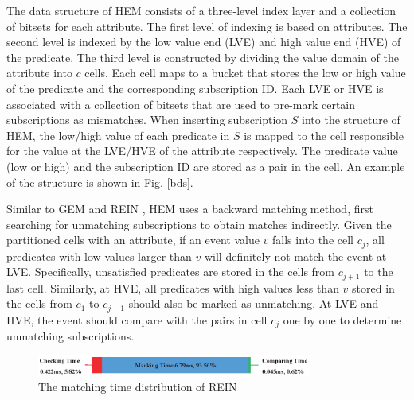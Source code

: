 \documentclass[runningheads]{llncs}
\begin{document}
The data structure of HEM consists of a three-level index layer and a collection of bitsets for each attribute.
The first level of indexing is based on attributes. The second level is indexed by the low value end (LVE) and high value end (HVE) of the predicate. The third level is constructed by dividing the value domain of the attribute into $c$ cells. Each cell maps to a bucket that stores the low or high value of the predicate and the corresponding subscription ID. 
Each LVE or HVE is associated with a collection of bitsets that are used to pre-mark certain subscriptions as mismatches. 
When inserting subscription $S$ into the structure of HEM, the low/high value of each predicate in $S$ is mapped to the cell responsible for the value at the LVE/HVE of the attribute respectively. The predicate value (low or high) and the subscription ID are stored as a pair in the cell. 
An example of the structure is shown in Fig. \ref{bds}.




Similar to GEM \cite{GEM} and REIN \cite{REIN}, HEM uses a backward matching method, first searching for unmatching subscriptions to obtain matches indirectly.
Given the partitioned cells with an attribute, if an event value $v$ falls into the cell $c_j$, all predicates with low values larger than $v$ will definitely not match the event at LVE. 
Specifically, unsatisfied predicates are stored in the cells from $c_{j+1}$ to the last cell. 
Similarly, at HVE, all predicates with high values less than $v$ stored in the cells from $c_1$ to $c_{j-1}$ should also be marked as unmatching. 
At LVE and HVE, the event should compare with the pairs in cell $c_j$ one by one to determine unmatching subscriptions.

\begin{figure}[tbp]
\centering
\includegraphics[width=9cm]{figures/ReinTimeDistribution.eps}
\caption{The matching time distribution of REIN}
\label{RTD}
\end{figure}
\end{document}
